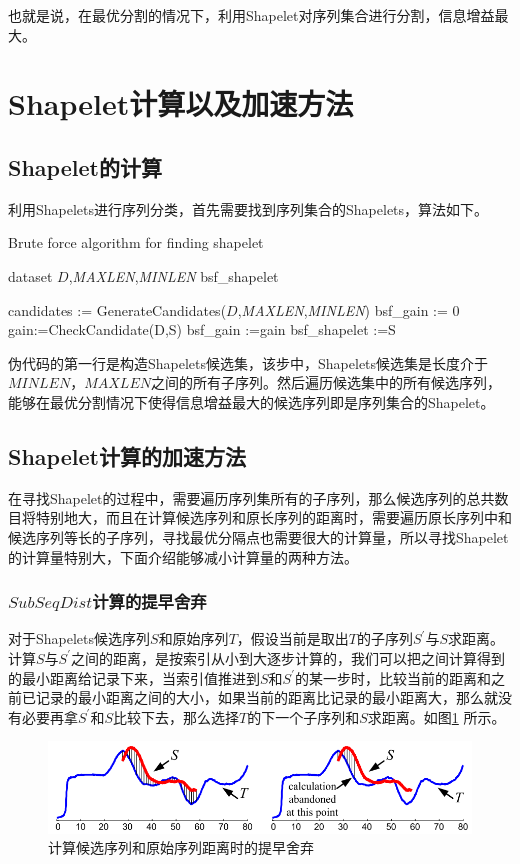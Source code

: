 也就是说，在最优分割的情况下，利用Shapelet对序列集合进行分割，信息增益最大。

\section{Shapelet计算以及加速方法}
\subsection{Shapelet的计算}
利用Shapelets进行序列分类，首先需要找到序列集合的Shapelets，算法如下。

\begin{algorithm}[h]
\caption{Brute force algorithm for finding shapelet}
\begin{algorithmic}[1]
\small
\REQUIRE dataset \textbf{$D$},\emph{MAXLEN},\emph{MINLEN}
\ENSURE bsf\_shapelet

\STATE candidates := GenerateCandidates(\textbf{$D$},\emph{MAXLEN},\emph{MINLEN})
\STATE bsf\_gain := 0
\STATE gain:=CheckCandidate(D,S)
\STATE bsf\_gain :=gain
\STATE bsf\_shapelet :=S
\ENDIF
\ENDFOR
\end{algorithmic}
\end{algorithm}

伪代码的第一行是构造Shapelets候选集，该步中，Shapelets候选集是长度介于$MINLEN$，$MAXLEN$之间的所有子序列。然后遍历候选集中的所有候选序列，能够在最优分割情况下使得信息增益最大的候选序列即是序列集合的Shapelet。

\subsection{Shapelet计算的加速方法}
在寻找Shapelet的过程中，需要遍历序列集所有的子序列，那么候选序列的总共数目将特别地大，而且在计算候选序列和原长序列的距离时，需要遍历原长序列中和候选序列等长的子序列，寻找最优分隔点也需要很大的计算量，所以寻找Shapelet的计算量特别大，下面介绍能够减小计算量的两种方法。

\subsubsection{$SubSeqDist$计算的提早舍弃}
对于Shapelets候选序列$S$和原始序列$T$，假设当前是取出$T$的子序列$S^{'}$与$S$求距离。计算$S$与$S^{'}$之间的距离，是按索引从小到大逐步计算的，我们可以把之间计算得到的最小距离给记录下来，当索引值推进到$S$和$S^{'}$的某一步时，比较当前的距离和之前已记录的最小距离之间的大小，如果当前的距离比记录的最小距离大，那么就没有必要再拿$S^{'}$和$S$比较下去，那么选择$T$的下一个子序列和$S$求距离。如图\ref{fig:15} 所示。
\begin{figure}[h]
  \centering
  \includegraphics[width=0.75\linewidth]{./figure/subdistance.PNG}
  \caption{计算候选序列和原始序列距离时的提早舍弃}\label{fig:15}
\end{figure}

